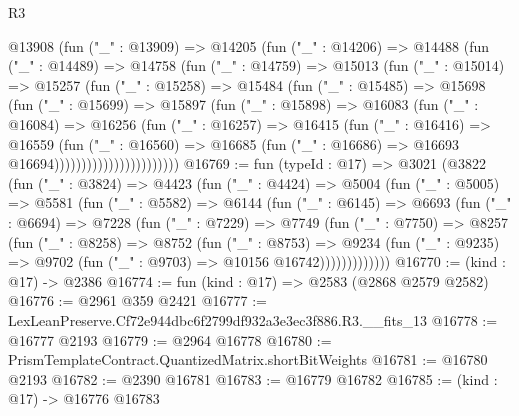 \begin{lexlean}{R3}
\begin{coremodule}
                    @13908
                      (fun ("_" : @13909) =>
                      @14205
                        (fun ("_" : @14206) =>
                        @14488
                          (fun ("_" : @14489) =>
                          @14758
                            (fun ("_" : @14759) =>
                            @15013
                              (fun ("_" : @15014) =>
                              @15257
                                (fun ("_" : @15258) =>
                                @15484
                                  (fun ("_" : @15485) =>
                                  @15698
                                    (fun ("_" : @15699) =>
                                    @15897
                                      (fun ("_" : @15898) =>
                                      @16083
                                        (fun ("_" : @16084) =>
                                        @16256
                                          (fun ("_" : @16257) =>
                                          @16415
                                            (fun ("_" : @16416) =>
                                            @16559
                                              (fun ("_" : @16560) =>
                                              @16685
                                                (fun ("_" : @16686) =>
                                                @16693 @16694)))))))))))))))))))))))
@16769 := fun (typeId : @17) =>
  @3021
    (@3822
      (fun ("_" : @3824) =>
      @4423
        (fun ("_" : @4424) =>
        @5004
          (fun ("_" : @5005) =>
          @5581
            (fun ("_" : @5582) =>
            @6144
              (fun ("_" : @6145) =>
              @6693
                (fun ("_" : @6694) =>
                @7228
                  (fun ("_" : @7229) =>
                  @7749
                    (fun ("_" : @7750) =>
                    @8257
                      (fun ("_" : @8258) =>
                      @8752
                        (fun ("_" : @8753) =>
                        @9234
                          (fun ("_" : @9235) =>
                          @9702 (fun ("_" : @9703) => @10156 @16742)))))))))))))
@16770 := (kind : @17) -> @2386
@16774 := fun (kind : @17) => @2583 (@2868 @2579 @2582)
@16776 := @2961 @359 @2421
@16777 := LexLeanPreserve.Cf72e944dbc6f2799df932a3e3ec3f886.R3.__fits_13
@16778 := @16777 @2193
@16779 := @2964 @16778
@16780 := PrismTemplateContract.QuantizedMatrix.shortBitWeights
@16781 := @16780 @2193
@16782 := @2390 @16781
@16783 := @16779 @16782
@16785 := (kind : @17) -> @16776 @16783

\end{coremodule}
\end{lexlean}
